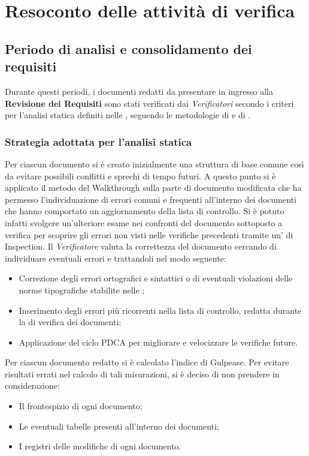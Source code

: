 \section{Resoconto delle attività di verifica}
\label{resoconto}
\subsection{Periodo di analisi e consolidamento dei requisiti}
Durante questi periodi, i documenti redatti da presentare in ingresso alla \textbf{Revisione dei Requisiti} sono stati verificati dai \textit{Verificatori} secondo i criteri per l'analisi statica definiti nelle , seguendo le metodologie di  e di .
\subsubsection{Strategia adottata per l'analisi statica}
Per ciascun documento si è creato inizialmente una struttura di base comune così da evitare possibili conflitti e sprechi di tempo futuri. A questo punto si è applicato il metodo del Walkthrough sulla parte di documento modificata che ha permesso l'individuazione di errori comuni e frequenti all'interno dei documenti che hanno comportato un aggiornamento della lista di controllo. Si è potuto infatti svolgere un’ulteriore esame nei confronti del documento sottoposto a verifica per scoprire gli errori non visti nelle verifiche precedenti tramite un' di Inspection. Il \textit{Verificatore} valuta la correttezza del documento cercando di individuare eventuali errori e trattandoli nel modo seguente:
	\begin{itemize}
		\item Correzione degli errori ortografici e sintattici o di eventuali violazioni delle norme tipografiche stabilite nelle ;
		\item Inserimento degli errori più ricorrenti nella lista di controllo, redatta durante la  di verifica dei documenti;
		\item Applicazione del ciclo PDCA per migliorare e velocizzare le verifiche future.
	\end{itemize}
Per ciascun documento redatto si è calcolato l'indice di Gulpease. Per evitare risultati errati nel calcolo di tali misurazioni, si è deciso di non prendere in considerazione:
\begin{itemize}
	\item Il frontespizio di ogni documento;
	\item Le eventuali tabelle presenti all'interno dei documenti;
	\item I registri delle modifiche di ogni documento.
\end{itemize}
